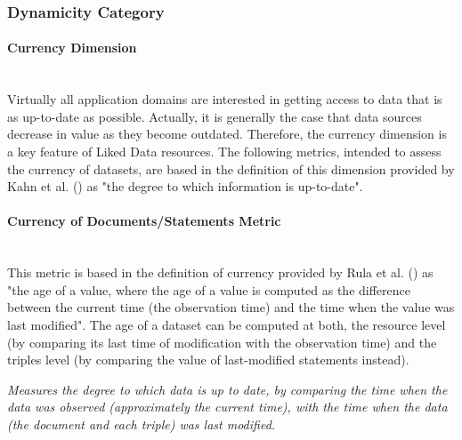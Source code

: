 
\subsubsection{Dynamicity Category}
\label{sec:Dynamicity} 


\paragraph{Currency Dimension}~\\ %
Virtually all application domains are interested in getting access to data that is as up-to-date as possible. Actually, it is generally the case that data sources decrease in value as they become outdated. Therefore, the currency dimension is a key feature of Liked Data resources. The following metrics, intended to assess the currency of datasets, are based in the definition of this dimension provided by Kahn et al. (\cite{Kahn2002}) as "the degree to which information is up-to-date".

\paragraph{Currency of Documents/Statements Metric} ~\\ %
This metric is based in the definition of currency provided by Rula et al. (\cite{Rula2012}) as "the age of a value, where the age of a value is computed as the difference between the current time (the observation time) and the time when the value was last modified". The age of a dataset can be computed at both, the resource level (by comparing its last time of modification with the observation time) and the triples level (by comparing the value of last-modified statements instead).
\begin{mdframed}[style=metricdefinition]
\emph{Measures the degree to which data is up to date, by comparing the time when the data was observed (approximately the current time), with the time when the data (the document and each triple) was last modified.}
\end{mdframed}

